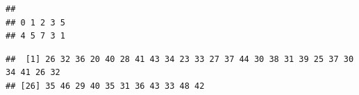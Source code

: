 \documentclass[nofonts,]{tufte-handout}
\newenvironment{Shaded}{\begin{snugshade}}{\end{snugshade}}
\newcommand{\CommentTok}[1]{\textcolor[rgb]{0.56,0.35,0.01}{\textit{#1}}}
\newcommand{\DataTypeTok}[1]{\textcolor[rgb]{0.13,0.29,0.53}{#1}}
\newcommand{\KeywordTok}[1]{\textcolor[rgb]{0.13,0.29,0.53}{\textbf{#1}}}
\newcommand{\NormalTok}[1]{#1}
\newcommand{\OperatorTok}[1]{\textcolor[rgb]{0.81,0.36,0.00}{\textbf{#1}}}
\newcommand{\StringTok}[1]{\textcolor[rgb]{0.31,0.60,0.02}{#1}}
\begin{document}
\begin{Shaded}
\end{Shaded}

\begin{verbatim}
## 
## 0 1 2 3 5 
## 4 5 7 3 1
\end{verbatim}

\begin{Shaded}
\end{Shaded}

\begin{verbatim}
##  [1] 26 32 36 20 40 28 41 43 34 23 33 27 37 44 30 38 31 39 25 37 30 34 41 26 32
## [26] 35 46 29 40 35 31 36 43 33 48 42
\end{verbatim}


\end{document}
